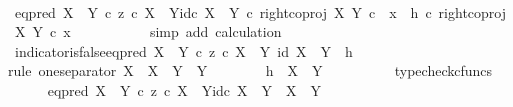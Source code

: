 \begin{isabellebody}
\ \isamarkupfalse%
\ {\isachardoublequoteopen}{\isacharparenleft}{\kern0pt}{\isacharparenleft}{\kern0pt}eq{\isacharunderscore}{\kern0pt}pred\ {\isacharparenleft}{\kern0pt}X\ {\isasymCoprod}\ Y{\isacharparenright}{\kern0pt}\ {\isasymcirc}\isactrlsub c\ {\isasymlangle}z\ {\isasymcirc}\isactrlsub c\ {\isasymbeta}\isactrlbsub X\ {\isasymCoprod}\ Y\isactrlesub {\isacharcomma}{\kern0pt}id\isactrlsub c\ {\isacharparenleft}{\kern0pt}X\ {\isasymCoprod}\ Y{\isacharparenright}{\kern0pt}{\isasymrangle}{\isacharparenright}{\kern0pt}\ {\isasymcirc}\isactrlsub c\ right{\isacharunderscore}{\kern0pt}coproj\ X\ Y{\isacharparenright}{\kern0pt}\ {\isasymcirc}\isactrlsub c\ \ x\ {\isacharequal}{\kern0pt}\ {\isacharparenleft}{\kern0pt}h\ {\isasymcirc}\isactrlsub c\ right{\isacharunderscore}{\kern0pt}coproj\ X\ Y{\isacharparenright}{\kern0pt}\ {\isasymcirc}\isactrlsub c\ x{\isachardoublequoteclose}\isanewline
\ \ \ \ \ \ \ \ \ \isamarkupfalse%
\ {\isacharparenleft}{\kern0pt}simp\ add{\isacharcolon}{\kern0pt}\ calculation{\isacharparenright}{\kern0pt}\isanewline
\ \ \ \ \isamarkupfalse%
\isanewline
\ \ \isamarkupfalse%
\isanewline
\ \ \isamarkupfalse%
\ indicator{\isacharunderscore}{\kern0pt}is{\isacharunderscore}{\kern0pt}false{\isacharcolon}{\kern0pt}{\isachardoublequoteopen}eq{\isacharunderscore}{\kern0pt}pred\ {\isacharparenleft}{\kern0pt}X\ {\isasymCoprod}\ Y{\isacharparenright}{\kern0pt}\ {\isasymcirc}\isactrlsub c\ {\isasymlangle}z\ {\isasymcirc}\isactrlsub c\ {\isasymbeta}\isactrlbsub X\ {\isasymCoprod}\ Y\isactrlesub {\isacharcomma}{\kern0pt}\ id\ {\isacharparenleft}{\kern0pt}X\ {\isasymCoprod}\ Y{\isacharparenright}{\kern0pt}{\isasymrangle}\ {\isacharequal}{\kern0pt}\ h{\isachardoublequoteclose}\isanewline
\ \ \isamarkupfalse%
{\isacharparenleft}{\kern0pt}rule\ one{\isacharunderscore}{\kern0pt}separator{\isacharbrackleft}{\kern0pt}\ X\ {\isacharequal}{\kern0pt}\ {\isachardoublequoteopen}X\ {\isasymCoprod}\ Y{\isachardoublequoteclose}{\isacharcomma}{\kern0pt}\ \ Y\ {\isacharequal}{\kern0pt}\ {\isasymOmega}{\isacharbrackright}{\kern0pt}{\isacharparenright}{\kern0pt}\isanewline
\ \ \ \ \isamarkupfalse%
\ {\isachardoublequoteopen}h\ {\isacharcolon}{\kern0pt}\ X\ {\isasymCoprod}\ Y\ {\isasymrightarrow}\ {\isasymOmega}{\isachardoublequoteclose}\isanewline
\ \ \ \ \ \ \isamarkupfalse%
\ typecheck{\isacharunderscore}{\kern0pt}cfuncs\isanewline
\ \ \ \ \isamarkupfalse%
\ {\isachardoublequoteopen}eq{\isacharunderscore}{\kern0pt}pred\ {\isacharparenleft}{\kern0pt}X\ {\isasymCoprod}\ Y{\isacharparenright}{\kern0pt}\ {\isasymcirc}\isactrlsub c\ {\isasymlangle}z\ {\isasymcirc}\isactrlsub c\ {\isasymbeta}\isactrlbsub X\ {\isasymCoprod}\ Y\isactrlesub {\isacharcomma}{\kern0pt}id\isactrlsub c\ {\isacharparenleft}{\kern0pt}X\ {\isasymCoprod}\ Y{\isacharparenright}{\kern0pt}{\isasymrangle}\ {\isacharcolon}{\kern0pt}\ X\ {\isasymCoprod}\ Y\ {\isasymrightarrow}\ {\isasymOmega}{\isachardoublequoteclose}\isanewline

\end{isabellebody}
